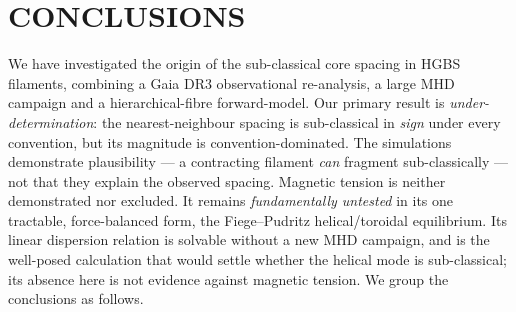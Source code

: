 \documentclass[usenatbib,twoside,twocolumn]{mnras}
\begin{document}
\section{CONCLUSIONS}

We have investigated the origin of the sub-classical core spacing in HGBS filaments, combining a Gaia DR3 observational re-analysis, a large MHD campaign and a hierarchical-fibre forward-model. Our primary result is \emph{under-determination}: the nearest-neighbour spacing is sub-classical in \emph{sign} under every convention, but its magnitude is convention-dominated. The simulations demonstrate plausibility --- a contracting filament \emph{can} fragment sub-classically --- not that they explain the observed spacing. Magnetic tension is neither demonstrated nor excluded. It remains \emph{fundamentally untested} in its one tractable, force-balanced form, the Fiege--Pudritz helical/toroidal equilibrium. Its linear dispersion relation is solvable without a new MHD campaign, and is the well-posed calculation that would settle whether the helical mode is sub-classical; its absence here is not evidence against magnetic tension. We group the conclusions as follows.
\end{document}
